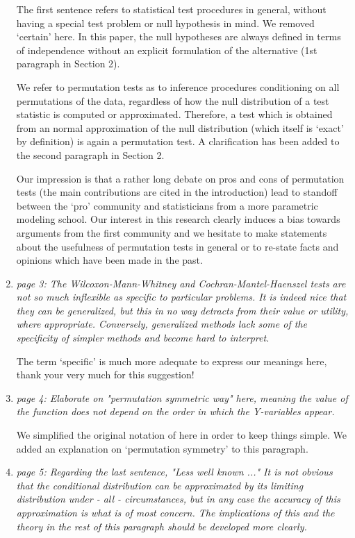\documentclass[11pt]{article}
\begin{document}
\begin{enumerate}
The first sentence refers to statistical test procedures in general,
without having a special test problem or null hypothesis in mind. We removed
`certain' here. In this paper, the null hypotheses are always defined in
terms of independence without an explicit formulation of the alternative
(1st paragraph in Section 2).

We refer to permutation tests as to inference procedures conditioning on all
permutations of the data, regardless of how the null distribution of a test
statistic is computed or approximated. Therefore, a test which is obtained
from an normal approximation of the null distribution (which itself is
`exact' by definition) is again a permutation test. A clarification has been
added to the second paragraph in Section 2.

Our impression is that a rather long debate on pros and cons of permutation
tests (the main contributions are cited in the introduction) lead to standoff
between the `pro' community and statisticians from a more parametric
modeling school. Our interest in this research clearly induces a bias
towards arguments from the first community and we hesitate to make
statements about the usefulness of permutation tests in general or to
re-state facts and opinions which have been made in the past.

\item \textsl{page 3:  The Wilcoxon-Mann-Whitney and Cochran-Mantel-Haenszel tests are not 
              so much inflexible as specific to particular problems. It is indeed nice that they 
              can be generalized, but this in no way detracts from their value or utility, where 
              appropriate. Conversely, generalized methods lack some of the specificity of 
              simpler methods and become hard to interpret.}

The term `specific' is much more adequate to express our meanings here,
thank your very much for this suggestion! 

\item \textsl{page 4:  Elaborate on "permutation symmetric way" here, meaning the value of the 
              function does not depend on the order in which the Y-variables appear.}

We simplified the original notation of \cite{StrasserWeber1999} here in
order to keep things simple. We added an explanation on `permutation
symmetry' to this paragraph.

 
\item \label{asympt} \textsl{page 5:  Regarding the last sentence, "Less well known ..." It is not obvious that 
              the conditional distribution can be approximated by its limiting distribution 
              under - all - circumstances, but in any case the accuracy of this approximation 
              is what is of most concern. The implications of this and the theory in the rest of 
              this paragraph should be developed more clearly. }


\end{enumerate}
\end{document}

